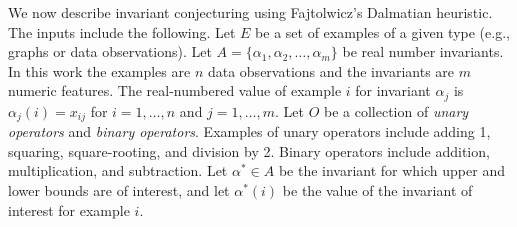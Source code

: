 \documentclass[ijds,nonblindrev]{informs-ijds}
\begin{document}
%
%
%


We now describe invariant conjecturing using Fajtolwicz's Dalmatian heuristic.  The inputs include the following.  Let $E$ be a set of examples of a given type (e.g., graphs or data observations). Let $A = \{\alpha_1, \alpha_2, \ldots, \alpha_m\}$ be real number invariants.  In this work the examples are $n$ data observations and the invariants are $m$ numeric features.  The real-numbered value of example $i$ for invariant $\alpha_j$ is $\alpha_j(i) = x_{ij}$ for $i=1,\ldots, n$ and $j=1,\ldots,m$.  Let $O$ be a collection of {\it unary operators} and {\it binary operators}.  Examples of unary operators include adding 1, squaring, square-rooting, and division by 2. Binary operators include addition, multiplication, and subtraction.  Let $\alpha^* \in A$ be the invariant for which upper and lower bounds are of interest, and let $\alpha^*(i)$ be the value of the invariant of interest for example $i$.
 
\end{document}
